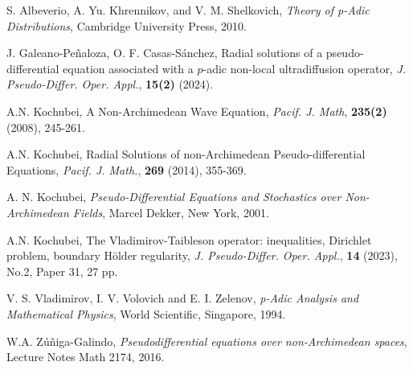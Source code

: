 \documentclass[14pt]{article}
\theoremstyle{theorem}
\theoremstyle{theorem}
\theoremstyle{definition}
\theoremstyle{lemma}
\newcommand{\Label}[1]{\label{#1}}
\numberwithin{equation}{section}
\begin{document}
\begin{thebibliography}{}

\Label{A}
S. Albeverio, A. Yu. Khrennikov, and V. M. Shelkovich, \textit{Theory of p-Adic Distributions}, Cambridge University Press, 2010.

\Label{G-C}
J. Galeano-Peñaloza, O. F. Casas-Sánchez, Radial solutions of a pseudo-differential equation associated with a $p$-adic non-local ultradiffusion operator, \textit{J. Pseudo-Differ. Oper. Appl.}, \textbf{15(2)} (2024).

\Label{K2008}
A.N. Kochubei, A Non-Archimedean Wave Equation, \textit{Pacif. J. Math}, \textbf{235(2)} (2008), 245-261.

\Label{K2014}
A.N. Kochubei, Radial Solutions of non-Archimedean Pseudo-differential Equations, \textit{Pacif. J. Math.}, \textbf{269} (2014), 355-369.

\Label{K2001}
A. N. Kochubei, \textit{Pseudo-Differential Equations and Stochastics over Non-Archimedean Fields}, Marcel Dekker, New York, 2001.

\Label{K2023}
A.N. Kochubei, The Vladimirov-Taibleson operator: inequalities, Dirichlet problem, boundary Hölder regularity, \textit{J. Pseudo-Differ. Oper. Appl.}, \textbf{14} (2023), No.2, Paper 31, 27 pp.

\Label{VVZ}
V. S. Vladimirov, I. V. Volovich and E. I. Zelenov, \textit{p-Adic Analysis and Mathematical
Physics}, World Scientific, Singapore, 1994.

\Label{Z}
W.A. Zúñiga-Galindo, \textit{Pseudodifferential equations over non-Archimedean spaces}, Lecture Notes Math 2174, 2016.

\end{thebibliography}
\end{document}
